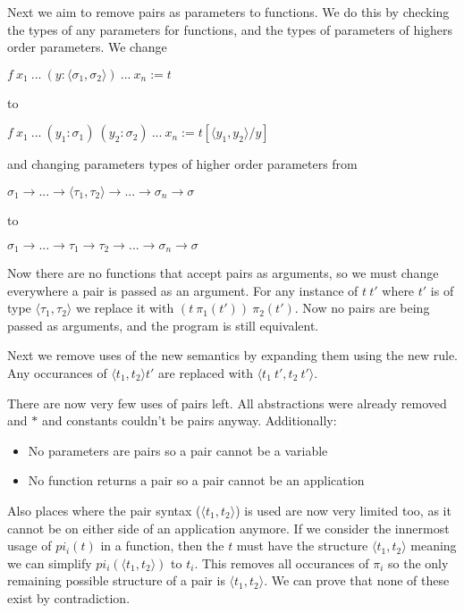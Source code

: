 \documentclass[12pt,a4paper,titlepage]{article}
\begin{document}
    Next we aim to remove pairs as parameters to functions. We do this by checking the types of any parameters
    for functions, and the types of parameters of highers order parameters. We change

    $f\ x_1\ ...\ (y: \langle \sigma_1, \sigma_2 \rangle)\ ...\ x_n := t$

    to

    $f\ x_1\ ...\ (y_1: \sigma_1)\ (y_2: \sigma_2)\ ...\ x_n := t[\langle y_1, y_2 \rangle / y]$

    and changing parameters types of higher order parameters from

    $\sigma_1 \rightarrow ... \rightarrow \langle \tau_1, \tau_2 \rangle \rightarrow ... \rightarrow \sigma_n \rightarrow \sigma$

    to

    $\sigma_1 \rightarrow ... \rightarrow \tau_1 \rightarrow \tau_2 \rightarrow ... \rightarrow \sigma_n \rightarrow \sigma$

    Now there are no functions that accept pairs as arguments, so we must change everywhere a pair is passed as
    an argument.
    For any instance of $t\ t'$ where $t'$ is of type $\langle \tau_1, \tau_2 \rangle$ we replace it with
    $(t\ \pi_1(t'))\ \pi_2(t')$.
    Now no pairs are being passed as arguments, and the program is still equivalent.

    Next we remove uses of the new semantics by expanding them using the new rule.
    Any occurances of $\langle t_1, t_2 \rangle t'$ are replaced with $\langle t_1\ t', t_2\ t' \rangle$.

    There are now very few uses of pairs left.
    All abstractions were already removed and $\ast$ and constants couldn't be pairs anyway.
    Additionally:
    \begin{itemize}
        \item No parameters are pairs so a pair cannot be a variable
        \item No function returns a pair so a pair cannot be an application
    \end{itemize}

    Also places where the pair syntax ($\langle t_1, t_2 \rangle$) is used are now very limited too, as
    it cannot be on either side of an application anymore.
    If we consider the innermost usage of $pi_i(t)$ in a function, then the $t$ must have the structure
    $\langle t_1, t_2 \rangle$ meaning we can simplify $pi_i(\langle t_1, t_2 \rangle)$ to $t_i$.
    This removes all occurances of $\pi_i$ so the only remaining possible structure of a pair is
    $\langle t_1, t_2 \rangle$. We can prove that none of these exist by contradiction.
\end{document}
